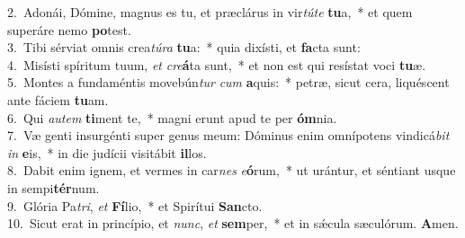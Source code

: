 {2.~}Adonái, Dómine, magnus es tu, et præclárus in vir\textit{tú}\textit{te} \textbf{tu}a,~* et quem superáre nemo \textbf{po}test.\\
{3.~}Tibi sérviat omnis crea\textit{tú}\textit{ra} \textbf{tu}a:~* quia dixísti, et \textbf{fa}cta sunt:\\
{4.~}Misísti spíritum tuum, \textit{et} \textit{cre}\textbf{á}ta sunt,~* et non est qui resístat voci \textbf{tu}æ.\\
{5.~}Montes a fundaméntis movebún\textit{tur} \textit{cum} \textbf{a}quis:~* petræ, sicut cera, liquéscent ante fáciem \textbf{tu}am.\\
{6.~}Qui \textit{au}\textit{tem} \textbf{ti}ment te,~* magni erunt apud te per \textbf{óm}nia.\\
{7.~}Væ genti insurgénti super genus meum: Dóminus enim omnípotens vindicá\textit{bit} \textit{in} \textbf{e}is,~* in die judícii visitábit \textbf{il}los.\\
{8.~}Dabit enim ignem, et vermes in car\textit{nes} \textit{e}\textbf{ó}rum,~* ut urántur, et séntiant usque in sempi\textbf{tér}num.\\
{9.~}Glória Pa\textit{tri}, \textit{et} \textbf{Fí}lio,~* et Spirítui \textbf{San}cto.\\
{10.~}Sicut erat in princípio, et \textit{nunc}, \textit{et} \textbf{sem}per,~* et in sǽcula sæculórum. \textbf{A}men.\\
